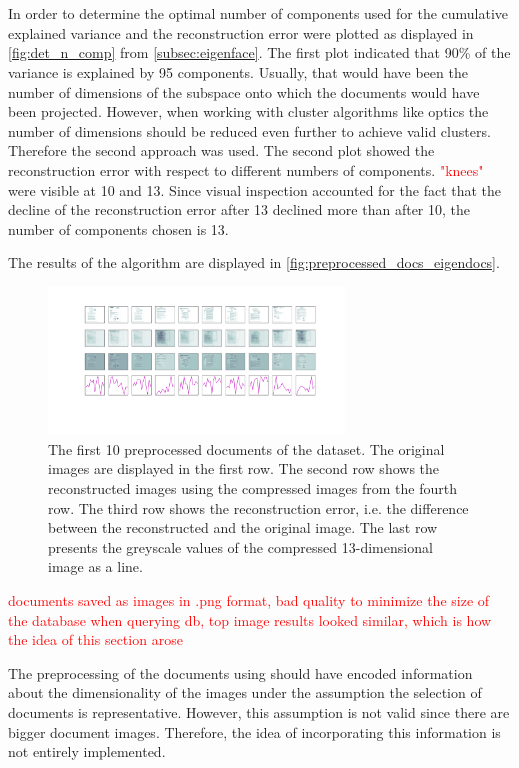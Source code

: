 \section{\eigendocs{}}\label{sec:evaluation-eigendocs}
In order to determine the optimal number of components used for \eigendocs{} the cumulative explained variance and the reconstruction error were plotted 
as displayed in \autoref{fig:det_n_comp} from \autoref{subsec:eigenface}.
The first plot indicated that 90\% of the variance is explained by 95 components.
Usually, that would have been the number of dimensions of the subspace onto which the documents would have been projected.
However, when working with cluster algorithms like \ac{optics} the number of dimensions should be reduced even further to achieve valid clusters.
Therefore the second approach was used.
The second plot showed the reconstruction error with respect to different numbers of components.
\textcolor{red}{"knees"} were visible at 10 and 13.
Since visual inspection accounted for the fact that the decline of the reconstruction error after 13 declined more than after 10, the number of components chosen is 13.

The results of the \eigendocs{} algorithm are displayed in \autoref{fig:preprocessed_docs_eigendocs}.

\begin{figure}[htp] %
    \centering
    \includegraphics[width=0.7\textwidth]{images/Eigendocs/transformation/eigendocs_13dims.pdf}
    \caption{The first 10 preprocessed documents of the dataset.
    The original images are displayed in the first row.
    The second row shows the reconstructed images using the compressed images from the fourth row.
    The third row shows the reconstruction error, i.e. the difference between the reconstructed and the original image.
    The last row presents the greyscale values of the compressed 13-dimensional image as a line.
    }
    \label{fig:preprocessed_docs_eigendocs}
\end{figure}


\textcolor{red}{documents saved as images in .png format, bad quality to minimize the size of the database
when querying db, top image results looked similar, which is how the idea of this section arose}

The preprocessing of the documents using \eigendocs{} should have encoded information about the dimensionality of the images 
under the assumption the selection of documents is representative.
However, this assumption is not valid since there are bigger document images.
Therefore, the idea of incorporating this information is not entirely implemented.